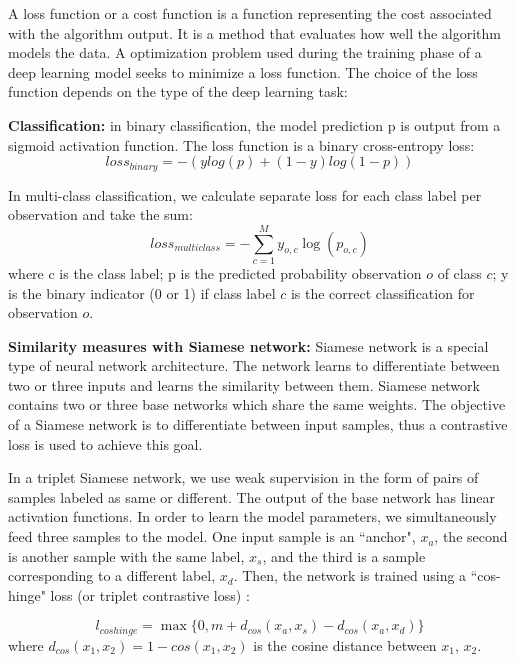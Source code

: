 A loss function or a cost function is a function representing the cost associated with the algorithm output. It is a method that evaluates how well the algorithm models the data. A optimization problem used during the training phase of a deep learning model seeks to minimize a loss function. The choice of the loss function depends on the type of the deep learning task:

\noindent\textbf{Classification:} in binary classification, the model prediction p is output from a sigmoid activation function. The loss function is a binary cross-entropy loss:
\begin{equation}
loss_{binary} = −(ylog(p)+(1−y)log(1−p))
\end{equation}

In multi-class classification, we calculate separate loss for each class label per observation and take the sum:
\begin{equation}
loss_{multiclass} = −\sum_{c=1}^{M} y_{o,c}\log(p_{o,c})
\end{equation}
where c is the class label; p is the predicted probability observation $o$ of class $c$; y is the binary indicator (0 or 1) if class label $c$ is the correct classification for observation $o$.

\noindent\textbf{Similarity measures with Siamese network:} Siamese network \cite{Gupta2017} is a special type of neural network architecture. The network learns to differentiate between two or three inputs and learns the similarity between them. Siamese network contains two or three base networks which share the same weights. The objective of a Siamese network is to differentiate between input samples, thus a contrastive loss is used to achieve this goal.

In a triplet Siamese network, we use weak supervision in the form of pairs of samples labeled as same or different. The output of the base network has linear activation functions. In order to learn the model parameters, we simultaneously feed three samples to the model. One input sample is an ``anchor", $x_a$, the second is another sample with the same label, $x_s$, and the third is a sample corresponding to a different label, $x_d$. Then, the network is trained using a ``cos-hinge" loss (or triplet contrastive loss) \cite{Settle2016a}: 

\begin{equation}
l_{cos hinge} = \max\{0, m + d_{cos}(x_a, x_s) − d_{cos}(x_a, x_d)\} 
\end{equation}
where $d_{cos}(x_1, x_2) = 1 − cos(x_1, x_2)$ is the cosine distance between $x_1$, $x_2$. 

